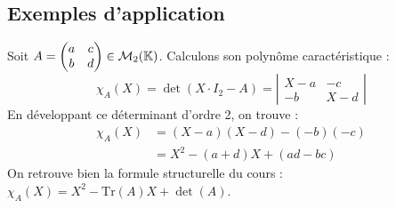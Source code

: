 \documentclass[12pt, a4paper]{report}
\begin{document}
\subsection{Exemples d'application}

\begin{example}
    Soit $A = \begin{pmatrix} a & c \\ b & d \end{pmatrix} \in \mathcal{M}_2(\mathbb{K})$. Calculons son polynôme caractéristique :
    $$\chi_A(X) = \det(X \cdot I_2 - A) = \left|\begin{matrix} X-a & -c \\ -b & X-d \end{matrix}\right|$$
    En développant ce déterminant d'ordre 2, on trouve :
    \begin{align*}
        \chi_A(X) &= (X-a)(X-d) - (-b)(-c) \\
        &= X^2 - (a+d)X + (ad - bc)
    \end{align*}
    On retrouve bien la formule structurelle du cours : $\chi_A(X) = X^2 - \text{Tr}(A)X + \det(A)$.
\end{example}
\end{document}
